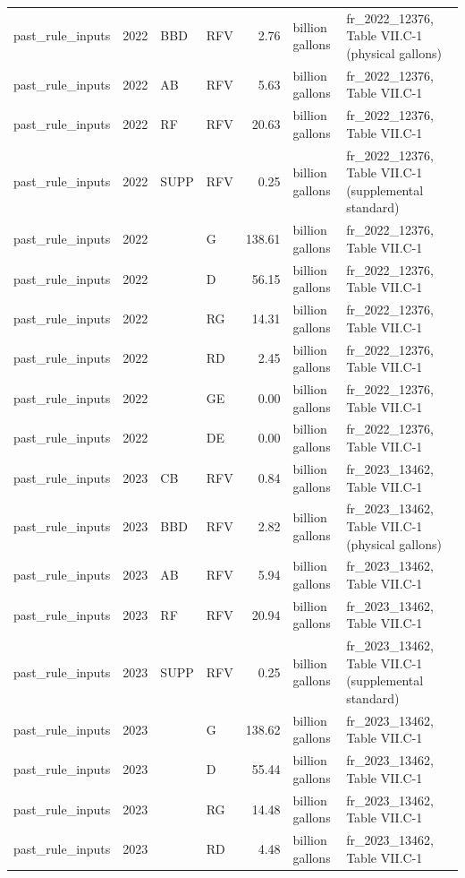 \begin{longtable}{p{2.3cm}p{0.7cm}p{1.0cm}p{2.6cm}rp{1.7cm}p{4.6cm}}
past\_rule\_inputs & 2022 & BBD & RFV & 2.76 & billion gallons & fr\_2022\_12376, Table VII.C-1 (physical gallons) \\
past\_rule\_inputs & 2022 & AB & RFV & 5.63 & billion gallons & fr\_2022\_12376, Table VII.C-1 \\
past\_rule\_inputs & 2022 & RF & RFV & 20.63 & billion gallons & fr\_2022\_12376, Table VII.C-1 \\
past\_rule\_inputs & 2022 & SUPP & RFV & 0.25 & billion gallons & fr\_2022\_12376, Table VII.C-1 (supplemental standard) \\
past\_rule\_inputs & 2022 &  & G & 138.61 & billion gallons & fr\_2022\_12376, Table VII.C-1 \\
past\_rule\_inputs & 2022 &  & D & 56.15 & billion gallons & fr\_2022\_12376, Table VII.C-1 \\
past\_rule\_inputs & 2022 &  & RG & 14.31 & billion gallons & fr\_2022\_12376, Table VII.C-1 \\
past\_rule\_inputs & 2022 &  & RD & 2.45 & billion gallons & fr\_2022\_12376, Table VII.C-1 \\
past\_rule\_inputs & 2022 &  & GE & 0.00 & billion gallons & fr\_2022\_12376, Table VII.C-1 \\
past\_rule\_inputs & 2022 &  & DE & 0.00 & billion gallons & fr\_2022\_12376, Table VII.C-1 \\
past\_rule\_inputs & 2023 & CB & RFV & 0.84 & billion gallons & fr\_2023\_13462, Table VII.C-1 \\
past\_rule\_inputs & 2023 & BBD & RFV & 2.82 & billion gallons & fr\_2023\_13462, Table VII.C-1 (physical gallons) \\
past\_rule\_inputs & 2023 & AB & RFV & 5.94 & billion gallons & fr\_2023\_13462, Table VII.C-1 \\
past\_rule\_inputs & 2023 & RF & RFV & 20.94 & billion gallons & fr\_2023\_13462, Table VII.C-1 \\
past\_rule\_inputs & 2023 & SUPP & RFV & 0.25 & billion gallons & fr\_2023\_13462, Table VII.C-1 (supplemental standard) \\
past\_rule\_inputs & 2023 &  & G & 138.62 & billion gallons & fr\_2023\_13462, Table VII.C-1 \\
past\_rule\_inputs & 2023 &  & D & 55.44 & billion gallons & fr\_2023\_13462, Table VII.C-1 \\
past\_rule\_inputs & 2023 &  & RG & 14.48 & billion gallons & fr\_2023\_13462, Table VII.C-1 \\
past\_rule\_inputs & 2023 &  & RD & 4.48 & billion gallons & fr\_2023\_13462, Table VII.C-1 \\

\end{longtable}
